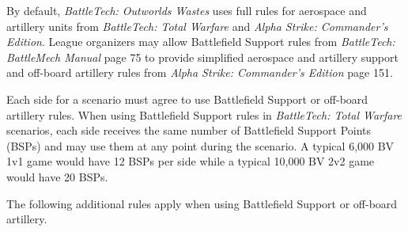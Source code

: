 By default, \emph{BattleTech: Outworlds Wastes} uses full rules for aerospace and artillery units from \emph{BattleTech: Total Warfare} and \emph{Alpha Strike: Commander's Edition}.
League organizers may allow Battlefield Support rules from \emph{BattleTech: BattleMech Manual} page 75 to provide simplified aerospace and artillery support and off-board artillery rules from \emph{Alpha Strike: Commander's Edition} page 151.

Each side for a scenario must agree to use Battlefield Support or off-board artillery rules.
When using Battlefield Support rules in \emph{BattleTech: Total Warfare} scenarios, each side receives the same number of Battlefield Support Points (BSPs) and may use them at any point during the scenario.
A typical 6,000 BV 1v1 game would have 12 BSPs per side while a typical 10,000 BV 2v2 game would have 20 BSPs.

The following additional rules apply when using Battlefield Support or off-board artillery.

